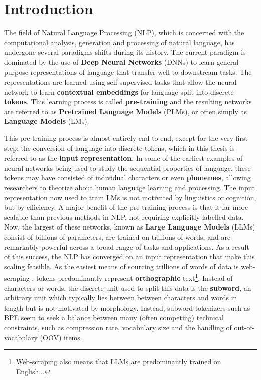 \chapter{Introduction}

The field of Natural Language Processing (NLP), which is concerned with the computational analysis, generation and processing of natural language, has undergone several paradigms shifts during its history. The current paradigm is dominated by the use of \textbf{Deep Neural Networks} (DNNs) to learn general-purpose representations of language that transfer well to downstream tasks. The representations are learned using self-supervised tasks that allow the neural network to learn \textbf{contextual embeddings} for language split into discrete \textbf{tokens}. This learning process is called \textbf{pre-training} and the resulting networks are referred to as \textbf{Pretrained Language Models} (PLMs), or often simply as \textbf{Language Models} (LMs). 

This pre-training process is almost entirely end-to-end, except for the very first step: the conversion of language into discrete tokens, which in this thesis is referred to as the \textbf{input representation}. In some of the earliest examples of neural networks being used to study the sequential properties of language, these tokens may have consisted of individual characters or even \textbf{phonemes}, allowing researchers to theorize about human language learning and processing. The input representation now used to train LMs is not motivated by linguistics or cognition, but by efficiency. A major benefit of the pre-training process is that it far more scalable than previous methods in NLP, not requiring explicitly labelled data. Now, the largest of these networks, known as \textbf{Large Language Models} (LLMs) consist of billions of parameters, are trained on trillions of words, and are remarkably powerful across a broad range of tasks and applications. As a result of this success, the NLP has converged on an input representation that make this scaling feasible. As the easiest means of sourcing trillions of words of data is web-scraping \addcites, tokens predominantly represent \textbf{orthographic} text\footnote{Web-scraping also means that LLMs are predominantly trained on English...}. Instead of characters or words, the discrete unit used to split this data is the \textbf{subword}, an arbitrary unit which typically lies between between characters and words in length but is not motivated by morphology. Instead, subword tokenizers such as BPE seem to seek a balance between many (often competing) technical constraints, such as compression rate, vocabulary size and the handling of out-of-vocabulary (OOV) items.

